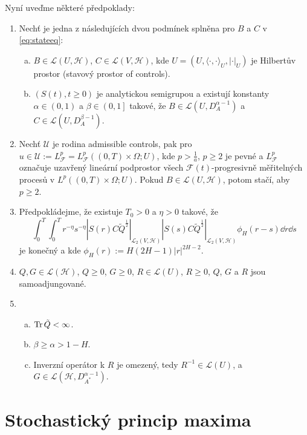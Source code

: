     Nyní uveďme některé předpoklady:
    \begin{enumerate}[({A}1)]
        \item Nechť je jedna z následujících dvou podmínek splněna pro $B$ a $C$ v
            \eqref{eq:stateeq}:
            \begin{enumerate}[(a)]
                \item $B\in\mathscr{L}\left( U,\mathscr{H} \right)$,
                    $C\in\mathscr{L}\left( V,\mathscr{H} \right)$, kde
                    $U = \left( U,\langle \cdot,\cdot \rangle_U,|\cdot|_U
                    \right)$ je Hilbertův prostor (stavový prostor of
                    controls).
                \item $\left(S(t),t\geq0\right)$ je analytickou semigrupou a
                    existují konstanty $\alpha\in\left( 0,1 \right)$ a
                $\beta\in\left( 0,1 \right]$ takové, že
                $B\in\mathscr{L}\left(U, D_A^{\alpha-1} \right)$ a
                $C\in\mathscr{L}\left(U, D_A^{\beta-1} \right)$.
            \end{enumerate}
        \item Nechť $\mathscr{U}$ je rodina admissible controls, pak pro
            $u\in\mathscr{U} := L_\mathscr{F}^p=L_\mathscr{F}^p\left( \left(
            0,T \right)\times \Omega;U \right)$, kde $p > \frac{1}{a}$,
            $p\geq2$ je pevné a $L_\mathscr{F}^p$ označuje uzavřený lineární
            podprostor všech $\mathscr{F}(t)$-progresivně měřitelných procesů v
            $L^p \left( \left( 0,T \right)\times \Omega;U \right)$. Pokud
            $B\in\mathscr{L}\left( U,\mathscr{H} \right)$, potom stačí, aby
            $p\geq2$.
        \item Předpokládejme, že existuje $T_0>0$ a $\eta>0$ takové, že
            $$ \int_0^T \int_0^T r^{-\eta}s^{-\eta}
            |S(r)C\tilde{Q}^{\frac{1}{2}}|_{\mathscr{L}_2\left(
            V,\mathscr{H} \right)}|S(s)C\tilde{Q}^{\frac{1}{2}}|_{\mathscr{L}_2\left(
            V,\mathscr{H} \right)} \phi_H(r-s)\dd r\!\dd s$$
            je konečný a kde $\phi_H(r):=H\left( 2H-1 \right)|r|^{2H-2}$.
        \item $Q,G\in\mathscr{L}(\mathscr{H})$, $Q\geq0$, $G\geq0$,
            $R\in\mathscr{L}(U)$, $R\geq0$, $Q$, $G$ a $R$ jsou
            samoadjungované.
        \item 
            \begin{enumerate}[(a)]
                \item $\operatorname{Tr}\tilde{Q}<\infty$.
                \item $\beta\geq\alpha>1-H$.
                \item Inverzní operátor k $R$ je omezený, tedy
                    $R^{-1}\in\mathscr{L}(U)$, a
                    $G\in\mathscr{L}(\mathscr{H},D_{A^*}^{\alpha-1})$.
            \end{enumerate}
    \end{enumerate}
    

\section{Stochastický princip maxima}
